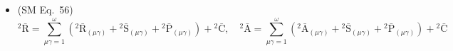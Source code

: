 \documentclass[12pt]{article}
\begin{document}
\begin{itemize}[label={},leftmargin=0pt]
\[\begin{aligned}
    &\quad + \sum_{\mu\gamma\chi\lambda=1}^{\omega} \left( \mathrm{K}^\mathrm{i}_{\mathrm{s,l}}(\mu\gamma)\mathrm{K}^\mathrm{s}_{\mathrm{km}}(\chi\lambda) - \mathrm{K}^\mathrm{i}_{\mathrm{sm}}(\mu\gamma)\mathrm{K}^\mathrm{s}_{\mathrm{kl}}(\chi\lambda) \right) + \sum_{\mu\gamma\chi\lambda=1}^{\omega} \left( \mathrm{K}^\mathrm{i}_{\mathrm{s,l}}(\mu\gamma)\left\{ \begin{smallmatrix} \mathrm{s} \\ \mathrm{k\ m} \end{smallmatrix} \right\}^{(\chi)}_{(\lambda)} + \right. \\
    &\quad \left. + \left\{ \begin{smallmatrix} \mathrm{i} \\ \mathrm{s\ l} \end{smallmatrix} \right\}^{(\mu)}_{(\gamma)}\mathrm{K}^\mathrm{s}_{\mathrm{km}}(\chi\lambda) - \mathrm{K}^\mathrm{i}_{\mathrm{sm}}(\mu\gamma)\left\{ \begin{smallmatrix} \mathrm{s} \\ \mathrm{k\ l} \end{smallmatrix} \right\}^{(\chi)}_{(\lambda)} - \left\{ \begin{smallmatrix} \mathrm{i} \\ \mathrm{s\ m} \end{smallmatrix} \right\}^{(\mu)}_{(\gamma)}\mathrm{K}^\mathrm{s}_{\mathrm{kl}}(\chi\lambda) \right) = \\
    &= \sum_{\mu\gamma=1}^{\omega} \left( \mathrm{R}^\mathrm{i}_{(\mu\gamma)\mathrm{klm}} + \mathrm{S}^\mathrm{i}_{(\mu\gamma)\mathrm{klm}} + \mathrm{P}^\mathrm{i}_{(\mu\gamma)\mathrm{klm} } \right) + \mathrm{C}^\mathrm{i}_{\mathrm{klm}}, \quad {}^4\bar{\mathrm{R}} = \sum_{\mu\gamma=1}^{\omega} \left( {}^4\bar{\mathrm{R}}_{(\mu\gamma)} + {}^4\bar{\mathrm{S}}_{(\mu\gamma)} + {}^4\bar{\mathrm{P}}_{(\mu\gamma)} \right) + {}^4\bar{\mathrm{C}}
    \end{aligned}
    \]

    \item (SM Eq.\ 56) 
    \[
    {}^2\bar{\mathrm{R}} = \sum_{\mu\gamma=1}^{\omega} \left( {}^2\bar{\mathrm{R}}_{(\mu\gamma)} + {}^2\bar{\mathrm{S}}_{(\mu\gamma)} + {}^2\bar{\mathrm{P}}_{(\mu\gamma)} \right) + {}^2\bar{\mathrm{C}}, \quad {}^2\bar{\mathrm{A}} = \sum_{\mu\gamma=1}^{\omega} \left( {}^2\bar{\mathrm{A}}_{(\mu\gamma)} + {}^2\bar{\mathrm{S}}_{(\mu\gamma)} + {}^2\bar{\mathrm{P}}_{(\mu\gamma)} \right) + {}^2\bar{\mathrm{C}}
    \]


\end{itemize}
\end{document}
